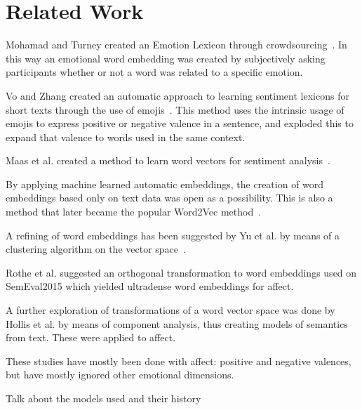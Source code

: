 \chapter{Related Work}
\label{chap:Related Work}

Mohamad and Turney created an Emotion Lexicon through crowdsourcing~\cite{mohammad_crowdsourcing_2013}. In this way an emotional word embedding was created by subjectively asking participants whether or not a word was related to a specific emotion.

Vo and Zhang created an automatic approach to learning sentiment lexicons for short texts through the use of emojis~\cite{vo_dont_2016}. This method uses the intrinsic usage of emojis to express positive or negative valence in a sentence, and exploded this to expand that valence to words used in the same context.

Maas et al. created a method to learn word vectors for sentiment analysis~\cite{maas_learning_2011}.

By applying machine learned automatic embeddings, the creation of word embeddings based only on text data was open as a possibility. This is also a method that later became the popular Word2Vec method~\cite{mikolov_distributed_2013}.

A refining of word embeddings has been suggested by Yu et al. by means of a clustering algorithm on the vector space~\cite{yu_refining_2017}.

Rothe et al. suggested an orthogonal transformation to word embeddings used on SemEval2015 which yielded ultradense word embeddings for affect\cite{rothe_ultradense_2016}.

A further exploration of transformations of a word vector space was done by Hollis et al. by means of component analysis, thus creating models of semantics from text. These were applied to affect\cite{hollis_principals_2016}.

These studies have mostly been done with affect: positive and negative valences, but have mostly ignored other emotional dimensions.


Talk about the models used and their history

